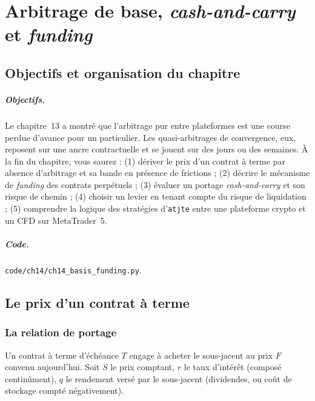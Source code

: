 \chapter{Arbitrage de base, \emph{cash-and-carry} et \emph{funding}}
\label{ch:14}

\section{Objectifs et organisation du chapitre}

\paragraph{Objectifs.} Le chapitre~13 a montré que l'arbitrage pur entre plateformes est une course perdue d'avance pour un particulier. Les quasi-arbitrages de convergence, eux, reposent sur une ancre contractuelle et se jouent sur des jours ou des semaines. À la fin du chapitre, vous saurez : (1) dériver le prix d'un contrat à terme par absence d'arbitrage et sa bande en présence de frictions ; (2) décrire le mécanisme de \emph{funding} des contrats perpétuels ; (3) évaluer un portage \emph{cash-and-carry} et son risque de chemin ; (4) choisir un levier en tenant compte du risque de liquidation ; (5) comprendre la logique des stratégies d'\texttt{atjte} entre une plateforme crypto et un CFD sur MetaTrader~5.

\paragraph{Code.} \texttt{code/ch14/ch14\_basis\_funding.py}.

\section{Le prix d'un contrat à terme}

\subsection{La relation de portage}

Un contrat à terme d'échéance $T$ engage à acheter le sous-jacent au prix $F$ convenu aujourd'hui. Soit $S$ le prix comptant, $r$ le taux d'intérêt (composé continûment), $q$ le rendement versé par le sous-jacent (dividendes, ou coût de stockage compté négativement).

